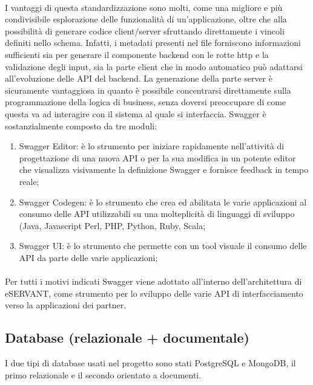 \paragraph{}

I vantaggi di questa standardizzazione sono molti, come una migliore e più condivisibile
esplorazione delle funzionalità di un’applicazione, oltre che alla possibilità di
generare codice client/server sfruttando direttamente i vincoli definiti nello schema. Infatti, i metadati presenti nel file forniscono informazioni sufficienti sia per
generare il componente backend con le rotte http e la validazione degli input, sia la parte client che in modo automatico può adattarsi all’evoluzione delle API del backend. La generazione della parte server è sicuramente vantaggiosa in quanto è possibile concentrarsi direttamente sulla programmazione della logica di business, senza doversi preoccupare di come questa va ad interagire con il sistema al quale si interfaccia. Swagger è sostanzialmente composto da tre moduli: 
\begin{enumerate}
    \item Swagger Editor: è lo strumento per iniziare rapidamente nell’attività di
    progettazione di una nuova API o per la sua modifica in un potente editor che
    visualizza visivamente la definizione Swagger e fornisce feedback in tempo
    reale;
    \item Swagger Codegen: è lo strumento che crea ed abilitata le varie applicazioni al
    consumo delle API utilizzabili su una molteplicità di linguaggi di sviluppo (Java,
    Javascript Perl, PHP, Python, Ruby, Scala;
    \item Swagger UI: è lo strumento che permette con un tool visuale il
    consumo delle API da parte delle varie applicazioni;
\end{enumerate}


\paragraph{}

Per tutti i motivi indicati Swagger viene adottato all’interno dell’architettura di
eSERVANT, come strumento per lo sviluppo delle varie API di interfacciamento verso
la applicazioni dei partner.


\subsection{Database (relazionale + documentale)}
I due tipi di database usati nel progetto sono stati PostgreSQL e MongoDB, il primo relazionale e il secondo orientato a documenti.
